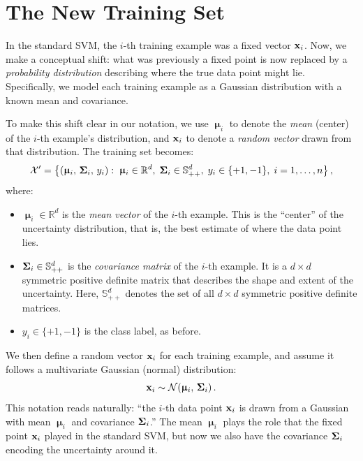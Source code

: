 \documentclass[11pt, letterpaper]{article}
\newcommand{\bSigma}{\vb{\Sigma}}
\newcommand{\bmu}{\boldsymbol{\upmu}}
\newcommand{\R}{\mathbb{R}}
\newcommand{\setX}{\mathcal{X}}
\newcommand{\Norm}{\mathcal{N}}
\begin{document}
\section{The New Training Set}\label{sec:gsu_training_set}

In the standard SVM, the $i$-th training example was a fixed vector $\vb{x}_i$. Now, we make a conceptual shift: what was previously a fixed point is now replaced by a \emph{probability distribution} describing where the true data point might lie. Specifically, we model each training example as a Gaussian distribution with a known mean and covariance.

To make this shift clear in our notation, we use $\bmu_i$ to denote the \emph{mean} (center) of the $i$-th example's distribution, and $\vb{x}_i$ to denote a \emph{random vector} drawn from that distribution. The training set becomes:
\begin{equation}\label{eq:gsu_training_set}
    \setX' = \left\{ \left(\bmu_i,\, \bSigma_i,\, y_i\right) :\; \bmu_i \in \R^d,\; \bSigma_i \in \mathbb{S}^d_{++},\; y_i \in \{+1, -1\},\; i = 1, \ldots, n \right\},
\end{equation}
where:
\begin{itemize}[leftmargin=2em]
    \item $\bmu_i \in \R^d$ is the \emph{mean vector} of the $i$-th example. This is the ``center'' of the uncertainty distribution, that is, the best estimate of where the data point lies.
    \item $\bSigma_i \in \mathbb{S}^d_{++}$ is the \emph{covariance matrix} of the $i$-th example. It is a $d \times d$ symmetric positive definite matrix that describes the shape and extent of the uncertainty. Here, $\mathbb{S}^d_{++}$ denotes the set of all $d \times d$ symmetric positive definite matrices.
    \item $y_i \in \{+1, -1\}$ is the class label, as before.
\end{itemize}
We then define a random vector $\vb{x}_i$ for each training example, and assume it follows a multivariate Gaussian (normal) distribution:
\begin{equation}\label{eq:gsu_rv}
    \vb{x}_i \sim \Norm\!\left(\bmu_i,\, \bSigma_i\right).
\end{equation}
This notation reads naturally: ``the $i$-th data point $\vb{x}_i$ is drawn from a Gaussian with mean $\bmu_i$ and covariance $\bSigma_i$.'' The mean $\bmu_i$ plays the role that the fixed point $\vb{x}_i$ played in the standard SVM, but now we also have the covariance $\bSigma_i$ encoding the uncertainty around it.
\end{document}
